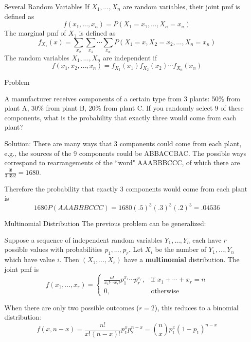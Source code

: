 \documentclass[handout]{beamer}
\renewcommand{\emph}{\textbf}
\begin{document}
\begin{frame}{Several Random Variables}
If $X_1, \dots, X_n$ are random variables, their joint pmf is defined as
$$f(x_1,\dots,x_n) =P(X_1=x_1, \dots, X_n=x_n)$$
\pause The marginal pmf of $X_1$ is defined as
$$f_{X_1}(x)= \sum_{x_2}\sum_{x_3}\cdots\sum_{x_n} P(X_1=x, X_2=x_2,\dots,X_n=x_n)$$
\pause The random variables $X_1,\dots,X_n$ are independent if
$$f(x_1,x_2,\dots,x_n) = f_{X_1}(x_1)f_{X_2}(x_2)\cdots f_{X_n}(x_n)$$
\end{frame}

\begin{frame}{Problem}
\begin{block}{}
A manufacturer receives components of a certain type from 3 plants: 50\% from plant A, 30\% from plant B, 20\% from plant C. If you randomly select 9 of these components, what is the probability that exactly three would come from each plant?
\end{block}

\pause Solution: There are many ways that 3 components could come from each plant, e.g., the sources of the 9 components could be ABBACCBAC. The possible ways correspond to  rearrangements of the ``word" AAABBBCCC, of which there are $\frac{9!}{3!3!3!}=1680$.

\vspace{.2cm}
\pause Therefore the probability that exactly 3 components would come from each plant is
$$1680P(AAABBBCCC) = 1680(.5)^3(.3)^3(.2)^3 =  .04536$$
\end{frame}

\begin{frame}{Multinomial Distribution}
The previous problem can be generalized:
\begin{block}{}
Suppose a sequence of independent random variables $Y_1,\dots,Y_n$ each have $r$ possible values with probabilities $p_1,\dots,p_r$. Let $X_i$ be the number of $Y_1,\dots,Y_n$ which have value $i$. Then $(X_1,\dots,X_r)$ have a \emph{multinomial} distribution. The joint pmf is
$$f(x_1,\dots,x_r) = \begin{cases}\frac{n!}{x_1!\cdots x_r!}p_1^{x_1}\cdots p_r^{x_r}, & \text{if }x_1+\cdots+x_r=n \\ 0, & \text{otherwise}\end{cases}$$
\end{block}
\pause When there are only two possible outcomes ($r=2$), this reduces to a binomial distribution:
$$f(x,n-x) = \frac{n!}{x!(n-x)!}p_1^xp_2^{n-x} = \binom n x p_1^x(1-p_1)^{n-x}$$
\end{frame}
\end{document}
